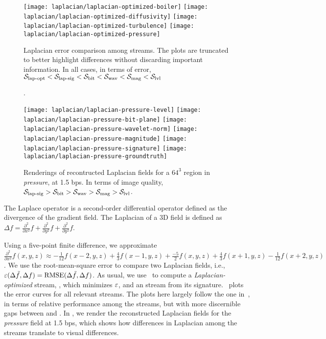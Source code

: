 \begin{figure*}[h]
\centering
{}
{\texttt{[image: laplacian/laplacian-optimized-boiler]}}
{\texttt{[image: laplacian/laplacian-optimized-diffusivity]}}
{\texttt{[image: laplacian/laplacian-optimized-turbulence]}}
{\texttt{[image: laplacian/laplacian-optimized-pressure]}}
\caption{Laplacian error comparison among streams. The plots are truncated to better highlight
differences without discarding important information. In all cases, in terms of error, $\slop <
\slsg < \sbit < \swav < \smag < \slvl$}.
\label{fig:laplacian-error-comparison}
\vspace{1em}

\centering
{}
{\texttt{[image: laplacian/laplacian-pressure-level]}}
{\texttt{[image: laplacian/laplacian-pressure-bit-plane]}}
{\texttt{[image: laplacian/laplacian-pressure-wavelet-norm]}}
{\texttt{[image: laplacian/laplacian-pressure-magnitude]}}
{\texttt{[image: laplacian/laplacian-pressure-signature]}}
{\texttt{[image: laplacian/laplacian-pressure-groundtruth]}}

\caption{Renderings of recontructed Laplacian fields for a $64^3$ region in \emph{pressure}, at 1.5
bps.  In terms of image quality, $\slsg > \sbit > \swav > \smag > \slvl$.}
\label{fig:laplacian-renderings}
\end{figure*}

The Laplace operator is a second-order differential operator defined as the divergence of the
gradient field. The Laplacian of a 3D field is defined as $\Delta
f=\frac{{\partial}^2}{\partial{x^2}}f+\frac{{\partial}^2}{\partial{y^2}}f+\frac{{\partial}^2}{\partial{y^2}}f$.

Using a five-point finite difference, we approximate $\frac{{\partial}^2}{\partial{x^2}}f(x,y,z)
\approx
-\frac{1}{12}f(x-2,y,z)+\frac{4}{3}f(x-1,y,z)+\frac{-5}{2}f(x,y,z)+\frac{4}{3}f(x+1,y,z)-\frac{1}{12}f(x+2,y,z)$.
We use the root-mean-square error to compare two Laplacian fields, i.e., $\err(\Delta
\tilde{f},\Delta f)=\text{RMSE}(\Delta \tilde{f},\Delta f)$. As usual, we use~ to
compute a \emph{Laplacian-optimized} stream, \slop, which minimizes $\err$, and an \slsg stream from
its signature.~ plots the error curves for all relevant
streams. The plots here largely follow the one in~, in terms of
relative performance among the streams, but with more discernible gaps between \sbit and \slsg. In
, we render the reconstructed Laplacian fields for the
\emph{pressure} field at 1.5 bps, which shows how differences in Laplacian among the streams
translate to visual differences.
